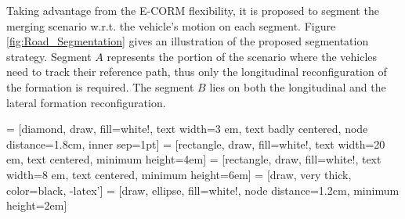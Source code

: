 Taking advantage from the E-CORM flexibility, it is proposed to segment the merging scenario w.r.t. the vehicle's motion on each segment. Figure \ref{fig:Road_Segmentation} gives an illustration of the proposed segmentation strategy. Segment $A$ represents the portion of the scenario where the vehicles need to track their reference path, thus only the longitudinal reconfiguration of the formation is required. The segment $B$ lies on both the longitudinal and the lateral formation reconfiguration. 



 = [diamond, draw, fill=white!,
    text width=3 em, text badly centered, node distance=1.8cm, inner sep=1pt]
 = [rectangle, draw, fill=white!,
    text width=20 em, text centered, minimum height=4em]
     = [rectangle, draw, fill=white!,
    text width=8 em, text centered, minimum height=6em]
 = [draw, very thick, color=black, -latex']
 = [draw, ellipse, fill=white!, node distance=1.2cm,
    minimum height=2em]
